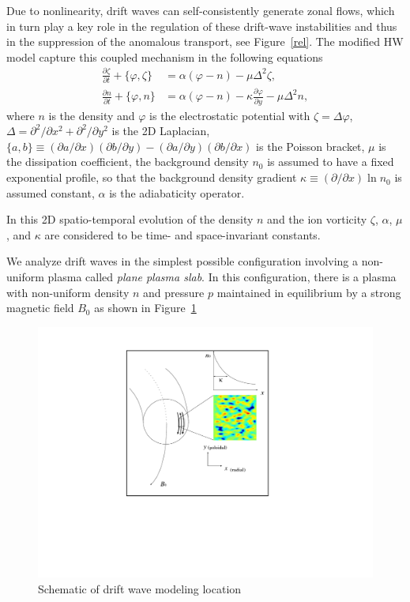 \documentclass[12pt,lot, lof]{puthesis}
\begin{document}
Due to nonlinearity, drift waves can self-consistently generate zonal flows, which in turn play a key role in the regulation of these drift-wave instabilities and thus in the suppression of the anomalous transport, see Figure~{\ref{rel}}. The modified HW model \cite{Hasegawa1,Hasegawa2} capture this coupled mechanism in the following equations
\begin{subequations}
\label{HW1}
\begin{align}
	\frac{\partial \zeta}{\partial t}  + \{\varphi , \zeta \} &= \alpha ({\varphi}-{n}) - \mu \Delta^2 \zeta \label{MHWeqs1}	, \\	
	\frac{\partial n}{\partial t}  + \{\varphi , n\} &=  \alpha ({\varphi}-{n}) -\kappa \frac{\partial \varphi}{\partial y}- \mu \Delta^2 n,
\label{HW2}	
\end{align}
\end{subequations}
where $n$ is the density and $\varphi$ is the electrostatic potential with $\zeta = \Delta \varphi$, $\Delta = \partial ^2 / \partial x^2+ \partial ^2 / \partial y^2$ is the 2D Laplacian, $\{a,b\} \equiv  \left( \partial a /\partial x  \right)\left( \partial b /\partial y \right)  -\left( \partial a /\partial y  \right)\left( \partial b /\partial x \right) $ is the Poisson bracket, $\mu$ is the dissipation coefficient, the background density $n_0$ is assumed to have a fixed exponential profile, so that the background density gradient  $\kappa \equiv  \left( \partial  /\partial x \right) \ln n_0$ is assumed constant, $\alpha $ is the adiabaticity operator.

In this 2D spatio-temporal evolution of the density $n$ and the ion vorticity $\zeta$, $\alpha$, $\mu$, and $\kappa$ are considered to be time- and space-invariant constants.

We analyze drift waves in the simplest possible configuration involving a non-uniform plasma called \emph{plane plasma slab}. In this configuration, there is a plasma with non-uniform density $n$ and pressure $p$ maintained in equilibrium by a strong magnetic field $B_0$ as shown in Figure~\ref{waka1}

\begin{figure}[htbp]
\centering
\includegraphics[width= 0.6\linewidth]{waka1}
\caption{Schematic of drift wave modeling location }
\label{waka1}
\end{figure}
\end{document}

